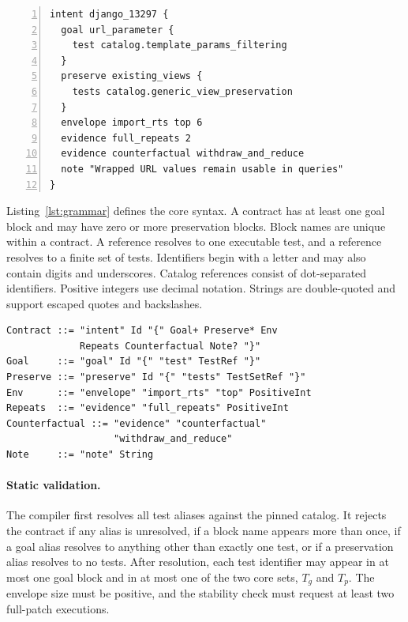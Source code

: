 \documentclass[a4paper,fleqn]{cas-sc}
\newcommand{\dsl}{\textsc{Shift-Intent}}
\newcommand{\code}[1]{\texttt{\detokenize{#1}}}
\begin{document}
\begin{lstlisting}[numbers=left,caption={\dsl{} contract for the running example.},label=lst:dsl]
intent django_13297 {
  goal url_parameter {
    test catalog.template_params_filtering
  }
  preserve existing_views {
    tests catalog.generic_view_preservation
  }
  envelope import_rts top 6
  evidence full_repeats 2
  evidence counterfactual withdraw_and_reduce
  note "Wrapped URL values remain usable in queries"
}
\end{lstlisting}

Listing~\ref{lst:grammar} defines the core syntax. A contract has at least one goal block and may have zero or more preservation blocks. Block names are unique within a contract. A \code{test} reference resolves to one executable test, and a \code{tests} reference resolves to a finite set of tests. Identifiers begin with a letter and may also contain digits and underscores. Catalog references consist of dot-separated identifiers. Positive integers use decimal notation. Strings are double-quoted and support escaped quotes and backslashes.

\begin{lstlisting}[numbers=none,basicstyle=\ttfamily\small,caption={Core grammar of \dsl{}, as implemented in the frontend. Quoted tokens are terminals.},label=lst:grammar]
Contract ::= "intent" Id "{" Goal+ Preserve* Env
             Repeats Counterfactual Note? "}"
Goal     ::= "goal" Id "{" "test" TestRef "}"
Preserve ::= "preserve" Id "{" "tests" TestSetRef "}"
Env      ::= "envelope" "import_rts" "top" PositiveInt
Repeats  ::= "evidence" "full_repeats" PositiveInt
Counterfactual ::= "evidence" "counterfactual"
                   "withdraw_and_reduce"
Note     ::= "note" String
\end{lstlisting}


\paragraph{Static validation.} The compiler first resolves all test aliases against the pinned catalog. It rejects the contract if any alias is unresolved, if a block name appears more than once, if a goal alias resolves to anything other than exactly one test, or if a preservation alias resolves to no tests. After resolution, each test identifier may appear in at most one goal block and in at most one of the two core sets, $T_g$ and $T_p$. The envelope size must be positive, and the stability check must request at least two full-patch executions.
\end{document}
